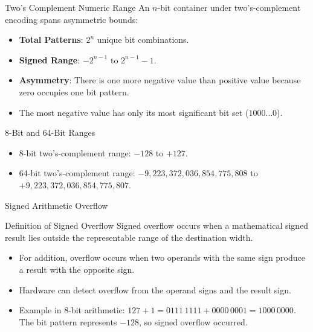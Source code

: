 \documentclass[aspectratio=169,11pt,t]{beamer}
\newcommand{\key}[1]{\textbf{#1}}
\begin{document}
\begin{frame}{Two's Complement Numeric Range}
An $n$-bit container under two's-complement encoding spans asymmetric bounds:
\vspace{0.2em}
\begin{itemize}
\item \key{Total Patterns}: $2^n$ unique bit combinations.
\item \key{Signed Range}: $-2^{n-1}$ to $2^{n-1} - 1$.
\item \key{Asymmetry}: There is one more negative value than positive value because zero occupies one bit pattern.
\item The most negative value has only its most significant bit set ($1000\dots0$).
\end{itemize}
\vspace{0.3em}
\begin{block}{8-Bit and 64-Bit Ranges}
\begin{itemize}
\item 8-bit two's-complement range: $-128$ to $+127$.
\item 64-bit two's-complement range: $-9,223,372,036,854,775,808$ to $+9,223,372,036,854,775,807$.
\end{itemize}
\end{block}
\end{frame}






\begin{frame}{Signed Arithmetic Overflow}
\begin{block}{Definition of Signed Overflow}
Signed overflow occurs when a mathematical signed result lies outside the representable range of the destination width.
\end{block}
\vspace{0.3em}
\begin{itemize}
\item For addition, overflow occurs when two operands with the same sign produce a result with the opposite sign.
\item Hardware can detect overflow from the operand signs and the result sign.
\item Example in 8-bit arithmetic:
$127 + 1 = 0111\,1111 + 0000\,0001 = 1000\,0000$.
The bit pattern represents $-128$, so signed overflow occurred.
\end{itemize}
\end{frame}
\end{document}

